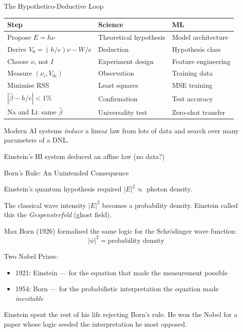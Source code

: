\documentclass[aspectratio=169]{beamer}
\begin{document}
\begin{frame}{The Hypothetico-Deductive Loop}

\begin{center}
\small
\begin{tabular}{p{4.0cm}p{4.0cm}p{4.0cm}}
\toprule
\textbf{Step} & \textbf{Science} & \textbf{ML} \\
\midrule
Propose $E = h\nu$              & Theoretical hypothesis & Model architecture \\
Derive $V_0 = (h/e)\nu - W/e$   & Deduction              & Hypothesis class \\
Choose $\nu$, not $I$           & Experiment design      & Feature engineering \\
Measure $(\nu_i, V_{0i})$       & Observation            & Training data \\
Minimise RSS                    & Least squares          & MSE training \\
$|\hat\beta - h/e| < 1\%$       & Confirmation           & Test accuracy \\
Na and Li: same $\hat\beta$     & Universality test      & Zero-shot transfer \\
\bottomrule
\end{tabular}
\end{center}

\bigskip
Modern AI systems  \emph{induce} a linear law from lots of data and
search over many parameters of a DNL.

Einstein's HI system  deduced  an affine law (no data?)

\end{frame}

\begin{frame}{Born's Rule: An Unintended Consequence}

Einstein's quantum hypothesis required $|E|^2 \propto$ photon density.

The classical wave intensity $|E|^2$ becomes a probability density.
Einstein called this the \emph{Gespensterfeld} (ghost field).

\medskip
Max Born (1926) formalised the same logic for the Schr\"odinger wave
function:
\[
  \boxed{|\psi|^2 = \text{probability density}}
\]

\medskip
Two Nobel Prizes:
\begin{itemize}
  \item 1921: Einstein --- for the equation that made the measurement
    possible
  \item 1954: Born --- for the probabilistic interpretation the equation
    made \emph{inevitable}
\end{itemize}

\medskip
Einstein spent the rest of his life rejecting Born's rule. He won the
Nobel for a paper whose logic seeded the interpretation he most opposed.

\end{frame}
\end{document}
